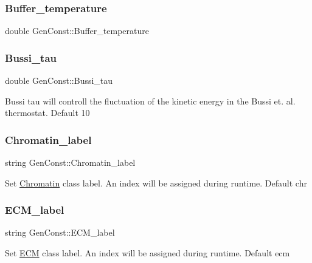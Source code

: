 \subsubsection{\texorpdfstring{Buffer\_temperature}{Buffer\_temperature}}
{\footnotesize\ttfamily double Gen\+Const\+::\+Buffer\+\_\+temperature}

\mbox{\label{namespaceGenConst_aad6835547fc7bc7ef3069986f08e2792}} 
\subsubsection{\texorpdfstring{Bussi\_tau}{Bussi\_tau}}
{\footnotesize\ttfamily double Gen\+Const\+::\+Bussi\+\_\+tau}

Bussi tau will controll the fluctuation of the kinetic energy in the Bussi et. al. thermostat. Default 10 \mbox{\label{namespaceGenConst_a2614662d6f315ee0639468cb7a42ee0c}} 
\subsubsection{\texorpdfstring{Chromatin\_label}{Chromatin\_label}}
{\footnotesize\ttfamily string Gen\+Const\+::\+Chromatin\+\_\+label}

Set \mbox{\hyperlink{classChromatin}{Chromatin}} class label. An index will be assigned during runtime. Default chr \mbox{\label{namespaceGenConst_a8a4424d53bb365766d5396d7b03df41e}} 
\subsubsection{\texorpdfstring{ECM\_label}{ECM\_label}}
{\footnotesize\ttfamily string Gen\+Const\+::\+E\+C\+M\+\_\+label}

Set \mbox{\hyperlink{classECM}{E\+CM}} class label. An index will be assigned during runtime. Default ecm \mbox{\label{namespaceGenConst_aed07d4c4a7f92cd150a09f87bdb65b70}} 
